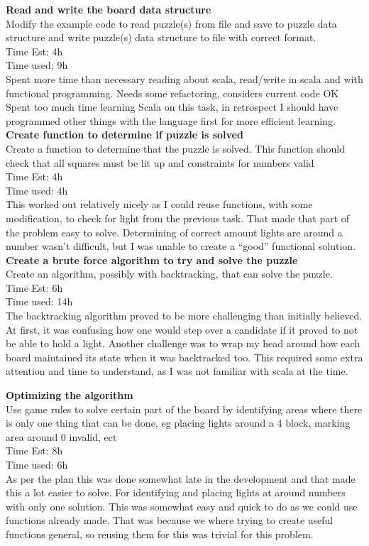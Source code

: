 \documentclass[12pt]{article}
\begin{document}
\textbf{Read and write the board data structure}\\
Modify the example code to read puzzle(s) from file and save to puzzle data structure and write puzzle(s) data structure to file with correct format.\\
Time Est: 4h\\
Time used: 9h \\
Spent more time than necessary reading about scala, read/write in scala and with functional programming. Needs some refactoring, considers current code OK\\
Spent too much time learning Scala on this task, in retrospect I should have programmed other things with the language first for more efficient learning.\\


\textbf{Create function to determine if puzzle is solved}\\
Create a function to determine that the puzzle is solved. This function should check that all squares must be lit up and constraints for numbers valid\\
Time Est: 4h\\
Time used: 4h\\
This worked out relatively nicely as I could reuse functions, with some modification, to check for light from the previous task. That made that part of the problem easy to solve. Determining of correct amount lights are around a number wasn't difficult, but I was unable to create a “good” functional solution.\\


\textbf{Create a brute force algorithm to try and solve the puzzle}\\
Create an algorithm, possibly with backtracking, that can solve the puzzle.\\
Time Est: 6h\\
Time used: 14h\\
The backtracking algorithm proved to be more challenging than initially believed. At first, it was confusing how one would step over a candidate if it proved to not be able to hold a light. Another challenge was to wrap my head around how each board maintained its state when it was backtracked too. This required some extra attention and time to understand, as I was not familiar with scala at the time.


\textbf{Optimizing the algorithm}\\
Use game rules to solve certain part of the board by identifying areas where there is only one thing that can be done, eg placing lights around a 4 block, marking area around 0 invalid, ect\\
Time Est: 8h\\
Time used: 6h\\
As per the plan this was done somewhat late in the development and that made this a lot easier to solve. For identifying and placing lights at around numbers with only one solution. This was somewhat easy and quick to do as we could use functions already made. That was because we where trying to create useful functions general, so reusing them for this was trivial for this problem. \\
    
\end{document}
